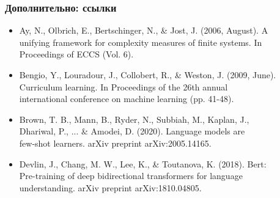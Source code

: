 \documentclass{beamer}
\begin{document}
\appendix

\begin{frame}[label=supplemental,noframenumbering]
	\frametitle{Дополнительно: ссылки}
	\begin{itemize}
		\item Ay, N., Olbrich, E., Bertschinger, N., \& Jost, J. (2006, August). A\\\hspace{1cm}unifying framework for
		complexity measures of finite systems. In\\\hspace{1cm}Proceedings of ECCS (Vol. 6).
		\item Bengio, Y., Louradour, J., Collobert, R., \& Weston, J. (2009, June).\\\hspace{1cm}Curriculum learning. In
		Proceedings of the 26th annual \\\hspace{1cm}international conference on machine learning (pp.
		41-48).
		\item Brown, T. B., Mann, B., Ryder, N., Subbiah, M., Kaplan, J., \\\hspace{1cm}Dhariwal, P., ... \& Amodei, D.
		(2020). Language models are\\\hspace{1cm}few-shot learners. arXiv preprint arXiv:2005.14165.
		\item Devlin, J., Chang, M. W., Lee, K., \& Toutanova, K. (2018). Bert: \\\hspace{1cm}Pre-training of deep
		bidirectional transformers for language\\\hspace{1cm} understanding. arXiv preprint
		arXiv:1810.04805.
	\end{itemize}
\end{frame}
\end{document}
